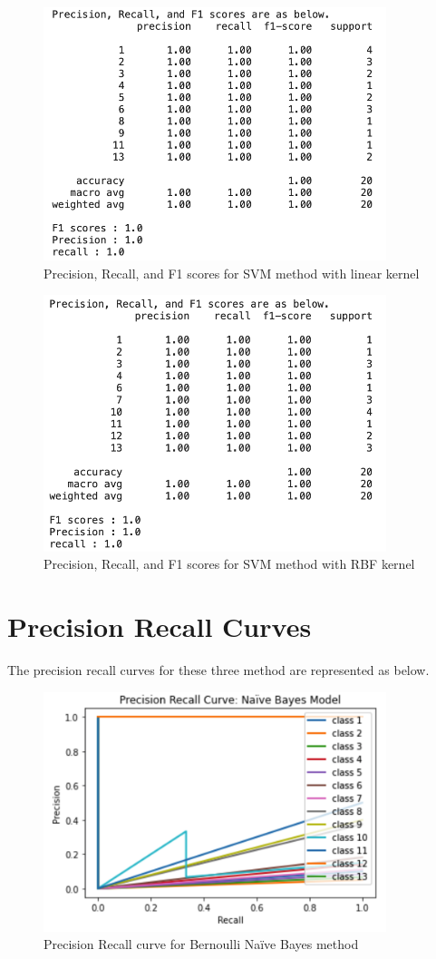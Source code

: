 \documentclass[a4paper]{article}
\theoremstyle{plain}
\begin{document}
\begin{figure}[htp]
    \centering
    \includegraphics[width=10cm]{fig/svmL_score.png}
    \caption{Precision, Recall, and F1 scores for SVM method with linear kernel}
    \label{fig:galaxy}
\end{figure}

\begin{figure}[htp]
    \centering
    \includegraphics[width=10cm]{fig/svmR_score.png}
    \caption{Precision, Recall, and F1 scores for SVM method with RBF kernel}
    \label{fig:galaxy}
\end{figure}
\newpage
\section{Precision Recall Curves}
The precision recall curves for these three method are represented as below.
\begin{figure}[htp]
    \centering
    \includegraphics[width=10cm]{fig/nb_fig.png}
    \caption{Precision Recall curve for Bernoulli Naïve Bayes method}
    \label{fig:galaxy}
\end{figure}
\end{document}
